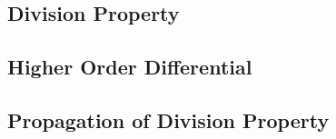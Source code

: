 \subsection{Division Property}

\subsection{Higher Order Differential}




\subsection{Propagation of Division Property} \label{subsec:prop_of_div_prop}

\subsection{\present[] \cite{DBLP:conf/ches/BogdanovKLPPRSV07}}	\label{subsec:present_cipher}

\subsection{\gift[] \cite{DBLP:conf/ches/BanikPPSST17}}	\label{subsec:gift_cipher}


